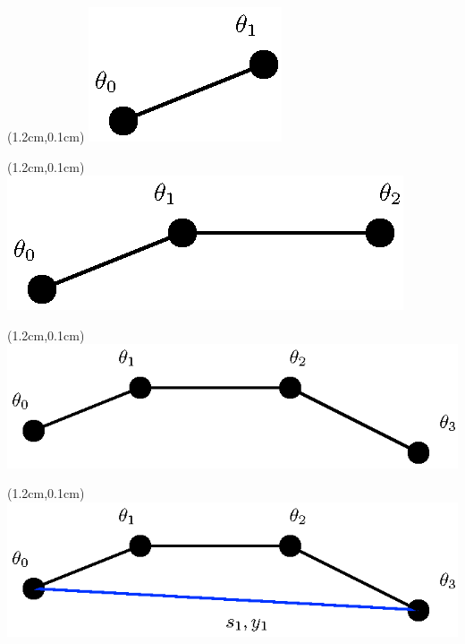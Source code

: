 \documentclass{beamer}
\begin{document}
							 \begin{frame}
\begin{textblock*}{0.2cm}(1.2cm,0.1cm) %
							 				\includegraphics[scale=0.5]{figures/10.eps}
\end{textblock*}
							 \end{frame}
							 \begin{frame}
\begin{textblock*}{0.2cm}(1.2cm,0.1cm) %
							 				\includegraphics[scale=0.5]{figures/9.eps}
\end{textblock*}
							 \end{frame}
							 \begin{frame}
\begin{textblock*}{0.2cm}(1.2cm,0.1cm) %
							 				\includegraphics[scale=0.5]{figures/8.eps}
\end{textblock*}
							 \end{frame}
							 \begin{frame}
\begin{textblock*}{0.2cm}(1.2cm,0.1cm) %
							 				\includegraphics[scale=0.5]{figures/7.eps}
\end{textblock*}
							 \end{frame}
\end{document}
